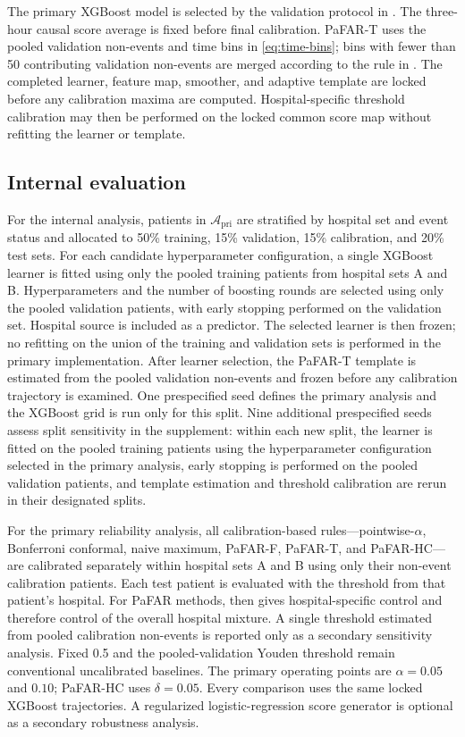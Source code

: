 \documentclass[11pt]{article}
\begin{document}
The primary XGBoost model is selected by the validation protocol in . The three-hour causal score average is fixed before final calibration. PaFAR-T uses the pooled validation non-events and time bins in \eqref{eq:time-bins}; bins with fewer than 50 contributing validation non-events are merged according to the rule in . The completed learner, feature map, smoother, and adaptive template are locked before any calibration maxima are computed. Hospital-specific threshold calibration may then be performed on the locked common score map without refitting the learner or template.

\subsection{Internal evaluation}

For the internal analysis, patients in $\mathcal A_{\mathrm{pri}}$ are stratified by hospital set and event status and allocated to 50\% training, 15\% validation, 15\% calibration, and 20\% test sets. For each candidate hyperparameter configuration, a single XGBoost learner is fitted using only the pooled training patients from hospital sets A and B. Hyperparameters and the number of boosting rounds are selected using only the pooled validation patients, with early stopping performed on the validation set. Hospital source is included as a predictor. The selected learner is then frozen; no refitting on the union of the training and validation sets is performed in the primary implementation. After learner selection, the PaFAR-T template is estimated from the pooled validation non-events and frozen before any calibration trajectory is examined. One prespecified seed defines the primary analysis and the XGBoost grid is run only for this split. Nine additional prespecified seeds assess split sensitivity in the supplement: within each new split, the learner is fitted on the pooled training patients using the hyperparameter configuration selected in the primary analysis, early stopping is performed on the pooled validation patients, and template estimation and threshold calibration are rerun in their designated splits.

For the primary reliability analysis, all calibration-based rules---pointwise-$\alpha$, Bonferroni conformal, naive maximum, PaFAR-F, PaFAR-T, and PaFAR-HC---are calibrated separately within hospital sets A and B using only their non-event calibration patients. Each test patient is evaluated with the threshold from that patient's hospital. For PaFAR methods,  then gives hospital-specific control and therefore control of the overall hospital mixture. A single threshold estimated from pooled calibration non-events is reported only as a secondary sensitivity analysis. Fixed 0.5 and the pooled-validation Youden threshold remain conventional uncalibrated baselines. The primary operating points are $\alpha=0.05$ and $0.10$; PaFAR-HC uses $\delta=0.05$. Every comparison uses the same locked XGBoost trajectories. A regularized logistic-regression score generator is optional as a secondary robustness analysis.
\end{document}
